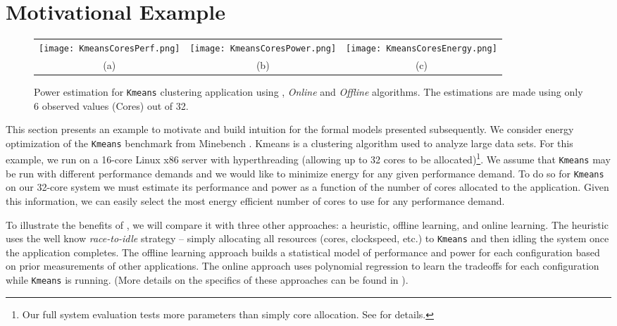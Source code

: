 \section{Motivational Example}
\label{sec:example}
\begin{figure*}
\begin{center}
\begin{tabular}[t!]{ccc}\hspace*{-15pt}
	\texttt{[image: KmeansCoresPerf.png]}&
	\texttt{[image: KmeansCoresPower.png]}&
	\texttt{[image: KmeansCoresEnergy.png]}\\
	 {(a)} &
	 {(b)} &
	  {(c)}
\end{tabular}
\vspace{-0.35em}
\caption{Power estimation for \texttt{Kmeans}
  clustering application using \SYSTEMLEO{}, \textit{Online} and
  \textit{Offline} algorithms. The estimations are made using only 6
  observed values (Cores) out of 32.}
\label{fig:Kmeans}
\end{center}
\end{figure*}
\vspace{-0.35em} This section presents an example to motivate
\SYSTEMLEO{} and build intuition for the formal models presented
subsequently.  We consider energy optimization of the \texttt{Kmeans}
benchmark from Minebench \cite{minebench}.  Kmeans is a clustering
algorithm used to analyze large data sets.  For this example, we run
on a 16-core Linux x86 server with hyperthreading (allowing up to 32
cores to be allocated)\footnote{Our full system evaluation tests more
  parameters than simply core allocation.  See 
  for details.}.  We assume that \texttt{Kmeans} may be run with
different performance demands and we would like to minimize energy for
any given performance demand.  To do so for \texttt{Kmeans} on our
32-core system we must estimate its performance and power as a
function of the number of cores allocated to the application.  Given
this information, we can easily select the most energy efficient
number of cores to use for any performance demand.

To illustrate the benefits of \SYSTEMLEO{}, we will compare it with three
other approaches: a heuristic, offline learning, and online learning.
The heuristic uses the well know \emph{race-to-idle} strategy --
simply allocating all resources (cores, clockspeed, etc.) to \texttt{Kmeans}
and then idling the system once the application completes.  The
offline learning approach builds a statistical model of performance
and power for each configuration based on prior measurements of other
applications.  The online approach uses polynomial regression to learn
the tradeoffs for each configuration while \texttt{Kmeans} is running. (More
details on the specifics of these approaches can be found in
).

